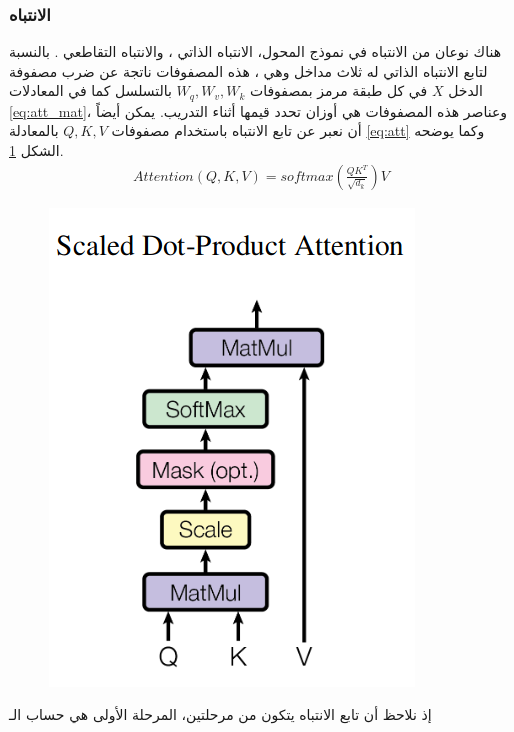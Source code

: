 \subsubsection{الانتباه\label{section:attention}}
 هناك نوعان من الانتباه في نموذج المحول، الانتباه الذاتي
،
والانتباه التقاطعي
.
بالنسبة لتابع الانتباه الذاتي له ثلاث مداخل وهي
،
هذه المصفوفات ناتجة عن ضرب مصفوفة الدخل
$X$
في كل طبقة مرمز بمصفوفات
$W_q,W_v,W_k$
 بالتسلسل كما في المعادلات
\ref{eq:att_mat}،
وعناصر هذه المصفوفات هي أوزان تحدد قيمها أثناء التدريب.
\newline
يمكن أيضاً أن نعبر عن تابع الانتباه باستخدام مصفوفات
$Q,K,V$
بالمعادلة
\ref{eq:att}
وكما يوضحه الشكل 
\ref{fig:att_dot_prod}.
\begin{equation}
\begin{split}
Attention(Q,K,V) = softmax(\frac{QK^T}{\sqrt{d_k}})V
\label{eq:att}
\end{split}
\end{equation}
\begin{figure}[h!]
\centerline{\includegraphics[scale=0.4]{images/att_dot_prod.png}}
\caption{
}
\label{fig:att_dot_prod}
\end{figure}
إذ نلاحظ أن تابع الانتباه يتكون من مرحلتين، المرحلة الأولى هي حساب الـ
